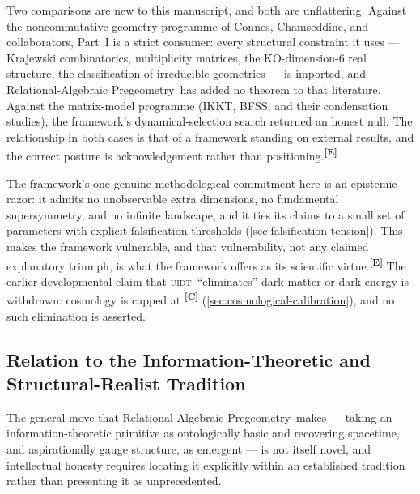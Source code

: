 \documentclass[12pt,a4paper,twoside]{article}
\theoremstyle{plain}
\theoremstyle{definition}
\theoremstyle{remark}
\newcommand{\ProjectShort}{Relational-Algebraic Pregeometry}
\newcommand{\RAP}{\ProjectShort}
\newcommand{\UIDT}{\textsc{uidt}} %
\newcommand{\catmark}[1]{\textsuperscript{\textsf{\textbf{[#1]}}}}
\begin{document}
Two comparisons are new to this manuscript, and both are unflattering. Against
the noncommutative-geometry programme of Connes, Chamseddine, and
collaborators, Part~I is a strict consumer: every structural constraint
it uses --- Krajewski combinatorics, multiplicity matrices, the
KO-dimension-6 real structure, the classification of irreducible
geometries --- is imported, and \RAP\ has added no theorem to that
literature. Against the matrix-model programme (IKKT, BFSS, and their
condensation studies), the framework's dynamical-selection search
returned an honest null. The relationship in both cases is that of a
framework standing on external results, and the correct posture is
acknowledgement rather than positioning.\catmark{E}

The framework's one genuine methodological commitment here is an
epistemic razor: it admits no unobservable extra dimensions, no
fundamental supersymmetry, and no infinite landscape, and it ties its
claims to a small set of parameters with explicit falsification
thresholds (\cref{sec:falsification-tension}). This makes the framework
vulnerable, and that vulnerability, not any claimed explanatory triumph,
is what the framework offers as its scientific virtue.\catmark{E} The
earlier developmental claim that \UIDT\ ``eliminates'' dark matter or
dark energy is withdrawn: cosmology is capped at \catmark{C}
(\cref{sec:cosmological-calibration}), and no such elimination is
asserted.

\subsection{Relation to the Information-Theoretic and Structural-Realist Tradition}
\label{subsec:prior-art}

The general move that \RAP\ makes --- taking an information-theoretic
primitive as ontologically basic and recovering spacetime, and
aspirationally gauge structure, as emergent --- is not itself novel, and
intellectual honesty requires locating it explicitly within an
established tradition rather than presenting it as unprecedented.
\end{document}
